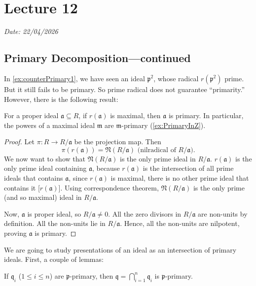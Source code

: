 \chapter{Lecture 12}

\hfill {\footnotesize \textit{Date: 22/04/2026}}

\section{Primary Decomposition---continued}
In \autoref{ex:counterPrimary1}, we have seen an ideal \( \mathfrak{p}^2 \), whose radical \( r(\mathfrak{p}^2) \) prime. But it still fails to be primary. So prime radical does not guarantee ``primarity.'' However, there is the following result: 
\begin{proposition}\label{primaryIdealCriterion}
    For a proper ideal \( \mathfrak{a} \subseteq R \), if \( r(\mathfrak{a}) \) is maximal, then \( \mathfrak{a} \) is primary. In particular, the powers of a maximal ideal \( \mathfrak{m} \) are \( \mathfrak{m} \)-primary (\autoref{ex:PrimaryInZ}).
\end{proposition}
\begin{proof}
    Let \( \pi : R \to R / \mathfrak{a} \) be the projection map. Then 
    \[
        \pi(r(\mathfrak{a})) = \mathfrak{N}(R / \mathfrak{a}) \text{ (nilradical of } R/ \mathfrak{a}).
    \]
    We now want to show that \( \mathfrak{N}(R / \mathfrak{a}) \) is the only prime ideal in \( R / \mathfrak{a} \). \( r(\mathfrak{a}) \) is the only prime ideal containing \( \mathfrak{a} \), because  \(r(\mathfrak{a}) \) is the intersection of all prime ideals that contains \( \mathfrak{a} \), since  \( r(\mathfrak{a}) \) is maximal, there is no other prime ideal that contains it [\( r(\mathfrak{a}) \)]. Using correspondence theorem, \( \mathfrak{N}(R / \mathfrak{a}) \) is the only prime (and so maximal) ideal in \( R / \mathfrak{a} \). 

    Now, \( \mathfrak{a} \) is proper ideal, so \( R / \mathfrak{a} \neq 0 \). All the zero divisors in \( R /\mathfrak{a} \) are non-units by definition. All the non-units lie in \( R / \mathfrak{a} \). Hence, all the non-units are nilpotent, proving \( \mathfrak{a} \) is primary.
\end{proof}
We are going to study presentations of an ideal as an intersection of primary ideals. First, a couple of lemmas:
\begin{lemma}\label{lem:capPPrimary}
    If \( \mathfrak{q}_i \) (\( 1 \le i \le n \)) are \( \mathfrak{p} \)-primary, then  \( \mathfrak{q} = \bigcap_{i=1}^n \mathfrak{q}_i \) is \( \mathfrak{p} \)-primary.
\end{lemma}
